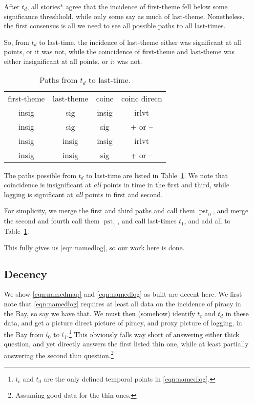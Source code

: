 \documentclass{amsart}
\DeclareMathOperator{\pst}{pst} %
\theoremstyle{definition}
\theoremstyle{remark}
\begin{document}
			After \(t_d\), all stories* agree that the incidence of first-theme fell below some significance threshhold, while only some say as much of last-theme. Nonetheless, the first consensus is all we need to see all possible paths to all last-times.
			
			So, from \(t_d\) to last-time, the incidence of last-theme either was significant at all points, or it was not, while the coincidence of first-theme and last-theme was either insignificant at all points, or it was not.
			\begin{table}
			\caption{Paths from \(t_d\) to last-time.}
			\label{tab:pathsforlog}
			\begin{tabular}{cccc}
			first-theme &last-theme &coinc &coinc direcn\\
			insig	&sig	&insig	&irlvt\\
			insig	&sig	&sig		&+ or --\\
			insig	&insig	&insig	&irlvt\\
			insig	&insig	&sig		&+ or --
			\end{tabular}
			\end{table}
			
			The paths possible from \(t_d\) to last-time are listed in Table~\ref{tab:pathsforlog}. We note that coincidence is insignificant at \emph{all} points in time in the first and third, while logging is significant at \emph{all} points in first and second.
			
			For simplicity, we merge the first and third paths and call them \(\pst_0\), and merge the second and fourth call them \(\pst_1\), and call last-times \(t_1\), and add all to Table~\ref{tab:pathsforlog}. 
			
			This fully gives us \ref{eqn:namedlog}, so our work here is done.
	\subsection{Decency}
	\label{ss:decency}
		We show \ref{eqn:namedmap} and \ref{eqn:namedlog} as built are decent here. We first note that \ref{eqn:namedlog} requires at least all data on the incidence of piracy in the Bay, so say we have that. We must then (somehow) identify \(t_c\) and \(t_d\) in these data, and get a picture direct picture of piracy, and proxy picture of logging, in the Bay from \(t_0\) to \(t_1\).\footnote{\(t_c\) and \(t_d\) are the only defined temporal points in \ref{eqn:namedlog}.} This obviously falls way short of answering either thick question, and yet directly answers the first listed thin one, while at least partially answering the second thin question.\footnote{Assuming good data for the thin ones.}
		
\end{document}
